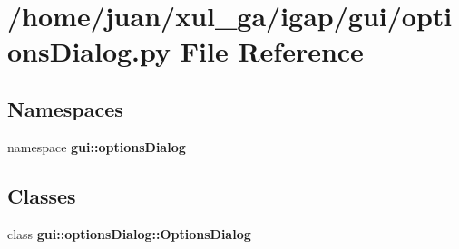 \section{/home/juan/xul\_\-ga/igap/gui/optionsDialog.py File Reference}
\label{optionsDialog_8py}
\subsection*{Namespaces}
\begin{CompactItemize}
\item 
namespace {\bf gui::optionsDialog}
\end{CompactItemize}
\subsection*{Classes}
\begin{CompactItemize}
\item 
class {\bf gui::optionsDialog::OptionsDialog}
\end{CompactItemize}
